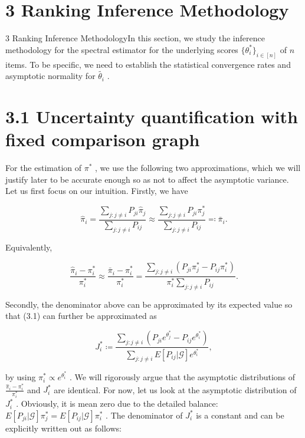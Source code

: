 

\section{3 Ranking Inference
Methodology}\label{ranking-inference-methodology}

3 Ranking Inference MethodologyIn this section, we study the inference
methodology for the spectral estimator for the underlying scores
\(\{\theta_{i}^{*}\}_{i\in [n]}\) of \(n\) items. To be specific, we
need to establish the statistical convergence rates and asymptotic
normality for \(\widetilde{\theta_{i}}\) .

\section{3.1 Uncertainty quantification with fixed comparison
graph}\label{uncertainty-quantification-with-fixed-comparison-graph}

For the estimation of \(\pi^{*}\) , we use the following two
approximations, which we will justify later to be accurate enough so as
not to affect the asymptotic variance. Let us first focus on our
intuition. Firstly, we have

\[
\widehat{\pi}_{i} = \frac{\sum_{j:j\neq i}P_{ji}\widehat{\pi}_{j}}{\sum_{j:j\neq i}P_{ij}}\approx \frac{\sum_{j:j\neq i}P_{ji}\pi_{j}^{*}}{\sum_{j:j\neq i}P_{ij}} \eqqcolon \bar{\pi}_{i}.
\]

Equivalently,

\[
\frac{\widehat{\pi}_{i} - \pi_{i}^{*}}{\pi_{i}^{*}}\approx \frac{\bar{\pi}_{i} - \pi_{i}^{*}}{\pi_{i}^{*}} = \frac{\sum_{j:j\neq i}(P_{ji}\pi_{j}^{*} - P_{ij}\pi_{i}^{*})}{\pi_{i}^{*}\sum_{j:j\neq i}P_{ij}}. \tag{3.1}
\]

Secondly, the denominator above can be approximated by its expected
value so that (3.1) can further be approximated as

\[
J_{i}^{*}\coloneqq \frac{\sum_{j:j\neq i}(P_{ji}e^{\theta_{j}^{*}} - P_{ij}e^{\theta_{i}^{*}})}{\sum_{j:j\neq i}E[P_{ij}|\mathcal{G}]e^{\theta_{i}^{*}}}, \tag{3.2}
\]

by using \(\pi_{i}^{*}\propto e^{\theta_{i}^{*}}\) . We will rigorously
argue that the asymptotic distributions of
\(\frac{\widehat{\pi}_{i} - \pi_{i}^{*}}{\pi_{i}^{*}}\) and
\(J_{i}^{*}\) are identical. For now, let us look at the asymptotic
distribution of \(J_{i}^{*}\) . Obviously, it is mean zero due to the
detailed balance:
\(E[P_{ji}|\mathcal{G}]\pi_{j}^{*} = E[P_{ij}|\mathcal{G}]\pi_{i}^{*}\)
. The denominator of \(J_{i}^{*}\) is a constant and can be explicitly
written out as follows:


